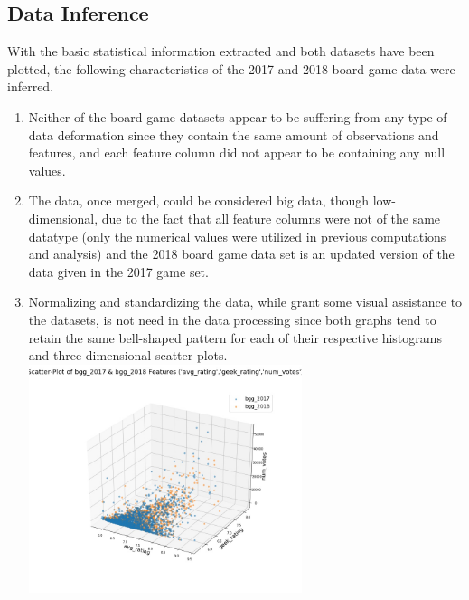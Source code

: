 \documentclass[a4paper,12pt]{IEEEtran}
\begin{document}
\subsection{Data Inference}
\label{sec7}
With the basic statistical information extracted and both datasets have been plotted, the following characteristics of the 2017 and 2018 board game data were inferred.
\begin{enumerate}
\item Neither of the board game datasets appear to be suffering from any type of data deformation since they contain the same amount of observations and features, and each feature column did not appear to be containing any null values.
\item The data, once merged, could be considered big data, though low-dimensional, due to the fact that all feature columns were not of the same datatype (only the numerical values were utilized in previous computations and analysis) and the 2018 board game data set is an updated version of the data given in the 2017 game set.
\item Normalizing and standardizing the data, while grant some visual assistance to the datasets, is not need in the data processing since both graphs tend to retain the same bell-shaped pattern for each of their respective histograms and three-dimensional scatter-plots.
\includegraphics[width=8cm]{bgg_3d01}
\end{enumerate}
\end{document}
